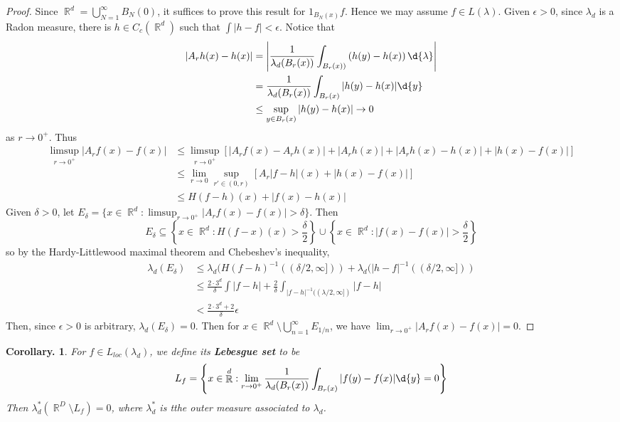 \documentclass[11pt, a4paper]{memoir}
\DeclareMathOperator{\R}{{\mathbb{R}}}
\theoremstyle{change}
\newtheorem{corollary}[theorem]{Corollary.}
\theoremstyle{plain}
\theoremstyle{nonumberplain}
\newtheorem{proof}{Proof}
\begin{document}
\begin{proof}
    Since $\R^d=\bigcup_{N=1}^\infty B_N(0)$, it suffices to prove this result for $1_{B_N(x)}f$.
    Hence we may assume $f\in L(\lambda)$.
    Given $\epsilon>0$, since $\lambda_d$ is a Radon measure, there is $h\in C_c(\R^d)$ such that $\int|h-f|<\epsilon$.
    Notice that
    \begin{align*}
        |A_rh(x)-h(x)|&=\left\lvert\frac{1}{\lambda_d(B_r(x))}\int_{B_r(x))}\left(h(y)-h(x)\right)\d{\lambda}\right\rvert\\
                      &= \frac{1}{\lambda_d(B_r(x))}\int_{B_r(x)}|h(y)-h(x)|\d{y}\\
                      &\leq \sup_{y\in B_r(x)}|h(y)-h(x)|\to 0
    \end{align*}
    as $r\to 0^+$.
    Thus
    \begin{align*}
        \limsup_{r\to 0^+}|A_rf(x)-f(x)|&\leq\limsup_{r\to 0^+}\left[|A_rf(x)-A_rh(x)|+|A_rh(x)|+|A_rh(x)-h(x)|+|h(x)-f(x)|\right]\\
                                        &\leq\lim_{r\to 0}\sup_{r'\in(0,r)}\left[A_r|f-h|(x)+|h(x)-f(x)|\right]\\
                                        &\leq H(f-h)(x)+|f(x)-h(x)|
    \end{align*}
    Given $\delta>0$, let $E_\delta=\{x\in\R^d:\limsup_{r\to 0^+}|A_rf(x)-f(x)|>\delta\}$.
    Then
    \begin{equation*}
        E_\delta\subseteq\left\{x\in\R^d:H(f-x)(x)>\frac{\delta}{2}\right\}\cup\left\{x\in\R^d:|f(x)-f(x)|>\frac{\delta}{2}\right\}
    \end{equation*}
    so by the Hardy-Littlewood maximal theorem and Chebeshev's inequality,
    \begin{align*}
        \lambda_d(E_\delta) &\leq\lambda_d(H(f-h)^{-1}((\delta/2,\infty]))+\lambda_d(|h-f|^{-1}((\delta/2,\infty]))\\
                            &\leq\frac{2\cdot 3^d}{\delta}\int|f-h|+\frac{2}{\delta}\int_{|f-h|^{-1}((\lambda/2,\infty])}|f-h|\\
                            &< \frac{2\cdot 3^d+2}{\delta}\epsilon
    \end{align*}
    Then, since $\epsilon>0$ is arbitrary, $\lambda_d(E_\delta)=0$.
    Then for $x\in\R^d\setminus\bigcup_{n=1}^\infty E_{1/n}$, we have $\lim_{r\to 0^+}|A_rf(x)-f(x)|=0$.
\end{proof}
\begin{corollary}
    For $f\in L_{loc}(\lambda_d)$, we define its \textbf{Lebesgue set} to be
    \begin{equation*}
        L_f=\left\{x\in\R^d:\lim_{r\to 0^+}\frac{1}{\lambda_d(B_r(x))}\int_{B_r(x)}|f(y)-f(x)|\d{y}=0\right\}
    \end{equation*}
    Then $\lambda_d^*(\R^D\setminus L_f)=0$, where $\lambda_d^*$ is tthe outer measure associated to $\lambda_d$.
\end{corollary}
\end{document}
